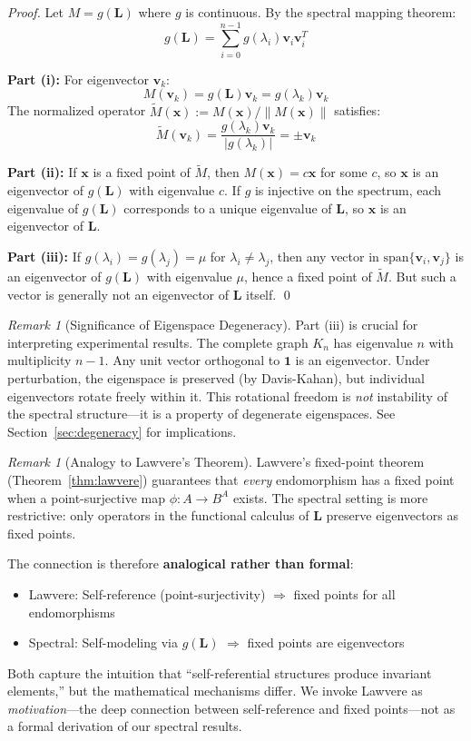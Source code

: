 \documentclass[11pt,a4paper]{article}
\theoremstyle{definition}
\theoremstyle{remark}
\newtheorem{remark}[theorem]{Remark}
\newcommand{\norm}[1]{\| #1 \|}
\newcommand{\Lap}{\mathbf{L}}
\begin{document}
\begin{proof}
Let $M = g(\Lap)$ where $g$ is continuous. By the spectral mapping theorem:
\[
g(\Lap) = \sum_{i=0}^{n-1} g(\lambda_i) \mathbf{v}_i \mathbf{v}_i^T
\]

\textbf{Part (i):} For eigenvector $\mathbf{v}_k$:
\[
M(\mathbf{v}_k) = g(\Lap) \mathbf{v}_k = g(\lambda_k) \mathbf{v}_k
\]
The normalized operator $\tilde{M}(\mathbf{x}) := M(\mathbf{x})/\norm{M(\mathbf{x})}$ satisfies:
\[
\tilde{M}(\mathbf{v}_k) = \frac{g(\lambda_k) \mathbf{v}_k}{|g(\lambda_k)|} = \pm \mathbf{v}_k
\]

\textbf{Part (ii):} If $\mathbf{x}$ is a fixed point of $\tilde{M}$, then $M(\mathbf{x}) = c\mathbf{x}$ for some $c$, so $\mathbf{x}$ is an eigenvector of $g(\Lap)$ with eigenvalue $c$. If $g$ is injective on the spectrum, each eigenvalue of $g(\Lap)$ corresponds to a unique eigenvalue of $\Lap$, so $\mathbf{x}$ is an eigenvector of $\Lap$.

\textbf{Part (iii):} If $g(\lambda_i) = g(\lambda_j) = \mu$ for $\lambda_i \neq \lambda_j$, then any vector in $\text{span}\{\mathbf{v}_i, \mathbf{v}_j\}$ is an eigenvector of $g(\Lap)$ with eigenvalue $\mu$, hence a fixed point of $\tilde{M}$. But such a vector is generally not an eigenvector of $\Lap$ itself. \qed
\end{proof}

\begin{remark}[Significance of Eigenspace Degeneracy]
\label{rmk:degeneracy}
Part (iii) is crucial for interpreting experimental results. The complete graph $K_n$ has eigenvalue $n$ with multiplicity $n-1$. Any unit vector orthogonal to $\mathbf{1}$ is an eigenvector. Under perturbation, the eigenspace is preserved (by Davis-Kahan), but individual eigenvectors rotate freely within it. This rotational freedom is \emph{not} instability of the spectral structure---it is a property of degenerate eigenspaces. See Section~\ref{sec:degeneracy} for implications.
\end{remark}

\begin{remark}[Analogy to Lawvere's Theorem]
\label{rmk:lawvere-analogy}
Lawvere's fixed-point theorem (Theorem~\ref{thm:lawvere}) guarantees that \emph{every} endomorphism has a fixed point when a point-surjective map $\phi: A \to B^A$ exists. The spectral setting is more restrictive: only operators in the functional calculus of $\Lap$ preserve eigenvectors as fixed points.

The connection is therefore \textbf{analogical rather than formal}:
\begin{itemize}
    \item Lawvere: Self-reference (point-surjectivity) $\Rightarrow$ fixed points for all endomorphisms
    \item Spectral: Self-modeling via $g(\Lap)$ $\Rightarrow$ fixed points are eigenvectors
\end{itemize}
Both capture the intuition that ``self-referential structures produce invariant elements,'' but the mathematical mechanisms differ. We invoke Lawvere as \emph{motivation}---the deep connection between self-reference and fixed points---not as a formal derivation of our spectral results.
\end{remark}
\end{document}
